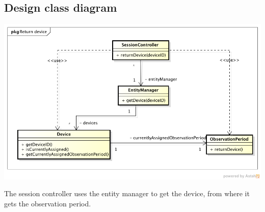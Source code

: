 \documentclass[fontsize=12pt,
               paper=a4,
               twoside=false,
               parskip=half,
               ]{scrartcl}
\begin{document}
\subsection{Design class diagram}

\includegraphics[width=15cm]{./img/design-class-diagrams/return-device.png}

The session controller uses the entity manager to get the device, from where it gets the observation period.
\end{document}
